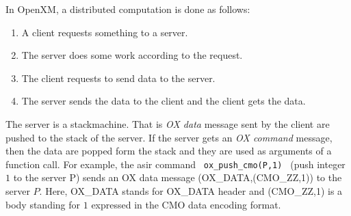 In OpenXM, a distributed computation is done as follows:
\begin{enumerate}
\item A client requests something to a server.
\item The server does some work according to the request.
\item The client requests to send data to the server.
\item The server sends the data to the client and the client gets the data.
\end{enumerate}
The server is a stackmachine. 
That is {\it OX data} message sent by the client
are pushed to the stack of the server. 
If the server gets an {\it OX command} message, then the data are
popped form the stack and they are used as arguments of a function call.
For example, the asir command
\verb+ ox_push_cmo(P,1) + (push integer $1$ to the server P)
sends an OX data message
(OX\_DATA,(CMO\_ZZ,1)) to the server $P$.
Here,
OX\_DATA stands for OX\_DATA header and 
(CMO\_ZZ,1) is a body standing for $1$ expressed 
in the CMO data encoding format.





